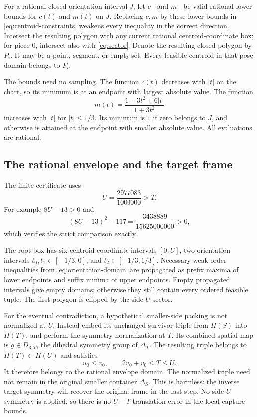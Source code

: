 \documentclass[11pt]{article}
\begin{document}
For a rational closed orientation interval $J$, let $c_-$ and $m_-$ be valid rational lower bounds for $c(t)$ and $m(t)$ on $J$. Replacing $c,m$ by these lower bounds in \eqref{eq:centroid-constraints} weakens every inequality in the correct direction. Intersect the resulting polygon with any current rational centroid-coordinate box; for piece $0$, intersect also with \eqref{eq:sector}. Denote the resulting closed polygon by $P_i$. It may be a point, segment, or empty set. Every feasible centroid in that pose domain belongs to $P_i$.

The bounds need no sampling. The function $c(t)$ decreases with $|t|$ on the chart, so its minimum is at an endpoint with largest absolute value. The function
\[
 m(t)=\frac{1-3t^2+6|t|}{1+3t^2}
\]
increases with $|t|$ for $|t|\le1/3$. Its minimum is $1$ if zero belongs to $J$, and otherwise is attained at the endpoint with smaller absolute value. All evaluations are rational.

\subsection{The rational envelope and the target frame}\label{subsec:envelope}

The finite certificate uses
\begin{equation}\label{eq:envelope}
 U=\frac{2977083}{1000000}>T.
\end{equation}
For example $8U-13>0$ and
\[
 (8U-13)^2-117=\frac{3438889}{15625000000}>0,
\]
which verifies the strict comparison exactly.

The root box has six centroid-coordinate intervals $[0,U]$, two orientation intervals $t_0,t_1\in[-1/3,0]$, and $t_2\in[-1/3,1/3]$. Necessary weak order inequalities from \eqref{eq:orientation-domain} are propagated as prefix maxima of lower endpoints and suffix minima of upper endpoints. Empty propagated intervals give empty domains; otherwise they still contain every ordered feasible tuple. The first polygon is clipped by the side-$U$ sector.

For the eventual contradiction, a hypothetical smaller-side packing is not normalized at $U$. Instead embed its unchanged survivor triple from $H(S)$ into $H(T)$, and perform the symmetry normalization at $T$. Its combined spatial map is $g\in D_{3,T}$, the dihedral symmetry group of $\Delta_T$. The resulting triple belongs to $H(T)\subset H(U)$ and satisfies
\[
 u_0\le v_0,\qquad 2u_0+v_0\le T\le U.
\]
It therefore belongs to the rational envelope domain. The normalized triple need not remain in the original smaller container $\Delta_S$. This is harmless: the inverse target symmetry will recover the original frame in the last step. No side-$U$ symmetry is applied, so there is no $U-T$ translation error in the local capture bounds.
\end{document}
